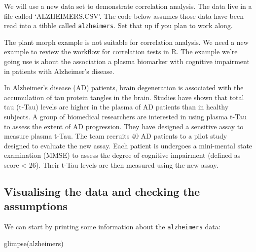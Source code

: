 \documentclass[
]{book}
\newenvironment{Shaded}{\begin{snugshade}}{\end{snugshade}}
\newcommand{\FunctionTok}[1]{\textcolor[rgb]{0.00,0.00,0.00}{#1}}
\newcommand{\NormalTok}[1]{#1}
\newenvironment{greybox}{
  \definecolor{shadecolor}{rgb}{0.95,0.95,0.95}  %
  \color{black}
  \begin{shaded}}
 {\end{shaded}}
\newenvironment{infobox}[1]
  {
  \begin{itemize}
  \renewcommand{\labelitemi}{
    \raisebox{-.7\height}[0pt][0pt]{
      {\setkeys{Gin}{width=3em,keepaspectratio}
        \texttt{[image: images/\#1]}}
    }
  }
  \setlength{\fboxsep}{1em}
  \begin{greybox}
  \item
  }
  {
  \end{greybox}
  \end{itemize}
  }
\begin{document}
\begin{infobox}{action}

\hypertarget{section-5}{%
\subsubsection*{}\label{section-5}}

We will use a new data set to demonstrate correlation analysis. The data live in a file called `ALZHEIMERS.CSV'. The code below assumes those data have been read into a tibble called \texttt{alzheimers}. Set that up if you plan to work along.

\end{infobox}

The plant morph example is not suitable for correlation analysis. We need a new example to review the workflow for correlation tests in R. The example we're going use is about the association a plasma biomarker with cognitive impairment in patients with Alzheimer's disease.

In Alzheimer's disease (AD) patients, brain degeneration is associated with the accumulation of tau protein tangles in the brain. Studies have shown that total tau (t-Tau) levels are higher in the plasma of AD patients than in healthy subjects. A group of biomedical researchers are interested in using plasma t-Tau to assess the extent of AD progression. They have designed a sensitive assay to measure plasma t-Tau. The team recruits 40 AD patients to a pilot study designed to evaluate the new assay. Each patient is undergoes a mini-mental state examination (MMSE) to assess the degree of cognitive impairment (defined as score \textless{} 26). Their t-Tau levels are then measured using the new assay.

\hypertarget{visualising-the-data-and-checking-the-assumptions-2}{%
\subsection{Visualising the data and checking the assumptions}\label{visualising-the-data-and-checking-the-assumptions-2}}

We can start by printing some information about the \texttt{alzheimers} data:

\begin{Shaded}
\begin{Highlighting}[]
\FunctionTok{glimpse}\NormalTok{(alzheimers)}
\end{Highlighting}
\end{Shaded}
\end{document}
